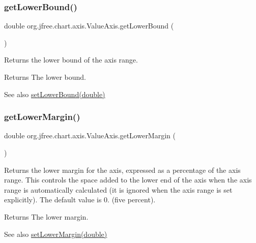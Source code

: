 \subsubsection{\texorpdfstring{get\+Lower\+Bound()}{getLowerBound()}}
{\footnotesize\ttfamily double org.\+jfree.\+chart.\+axis.\+Value\+Axis.\+get\+Lower\+Bound (\begin{DoxyParamCaption}{ }\end{DoxyParamCaption})}

Returns the lower bound of the axis range.

\begin{DoxyReturn}{Returns}
The lower bound.
\end{DoxyReturn}
\begin{DoxySeeAlso}{See also}
\mbox{\hyperlink{classorg_1_1jfree_1_1chart_1_1axis_1_1_value_axis_a0d48d13633027f697aa6f909bc39444c}{set\+Lower\+Bound(double)}} 
\end{DoxySeeAlso}
\mbox{\label{classorg_1_1jfree_1_1chart_1_1axis_1_1_value_axis_aad1a68a143582b583b76f5b632014f50}} 
\subsubsection{\texorpdfstring{get\+Lower\+Margin()}{getLowerMargin()}}
{\footnotesize\ttfamily double org.\+jfree.\+chart.\+axis.\+Value\+Axis.\+get\+Lower\+Margin (\begin{DoxyParamCaption}{ }\end{DoxyParamCaption})}

Returns the lower margin for the axis, expressed as a percentage of the axis range. This controls the space added to the lower end of the axis when the axis range is automatically calculated (it is ignored when the axis range is set explicitly). The default value is 0. (five percent).

\begin{DoxyReturn}{Returns}
The lower margin.
\end{DoxyReturn}
\begin{DoxySeeAlso}{See also}
\mbox{\hyperlink{classorg_1_1jfree_1_1chart_1_1axis_1_1_value_axis_a74bac229eb07e3502a9ca3934563a636}{set\+Lower\+Margin(double)}} 
\end{DoxySeeAlso}
\mbox{\label{classorg_1_1jfree_1_1chart_1_1axis_1_1_value_axis_a8cb8bb0f108e528454263e94bd1bd35c}} 
